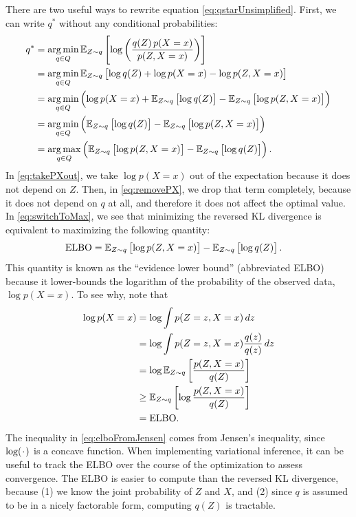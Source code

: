 \documentclass[11pt]{article}
\newcommand{\ELBO}{\mathrm{ELBO}}
\newcommand*{\placeholder}{\makebox[1ex]{$\cdot$}}
\begin{document}
There are two useful ways to rewrite equation \eqref{eq:qstarUnsimplified}.
First, we can write $q^*$ without any conditional probabilities:
\begin{align}
q^*
&= \operatorname*{arg\,min}_{q \in Q} \mathbb{E}_{\substack{Z \sim q}}\left[  \log \left( \frac{q(Z) \, p(X = x)}{p(Z, X = x)} \right)  \right] \\
&= \operatorname*{arg\,min}_{q \in Q} \mathbb{E}_{\substack{Z \sim q}}\left[  \log q(Z) + \log p(X = x) - \log p(Z, X = x)  \right] \\
\label{eq:takePXout}
&= \operatorname*{arg\,min}_{q \in Q} \left(
    \log p(X = x) + \mathbb{E}_{\substack{Z \sim q}}\left[  \log q(Z)  \right] - \mathbb{E}_{\substack{Z \sim q}}\left[  \log p(Z, X = x)  \right]
    \right) \\
\label{eq:removePX}
&= \operatorname*{arg\,min}_{q \in Q} \left(
    \mathbb{E}_{\substack{Z \sim q}}\left[  \log q(Z)  \right] - \mathbb{E}_{\substack{Z \sim q}}\left[  \log p(Z, X = x)  \right]
    \right) \\
\label{eq:switchToMax}
&= \operatorname*{arg\,max}_{q \in Q} \left(
    \mathbb{E}_{\substack{Z \sim q}}\left[  \log p(Z, X = x)  \right] - \mathbb{E}_{\substack{Z \sim q}}\left[  \log q(Z)  \right]
\right).
\end{align}
In \eqref{eq:takePXout}, we take $\log p(X = x)$ out of the expectation because it does not depend on $Z$.
Then, in \eqref{eq:removePX}, we drop that term completely, because it does not depend on $q$ at all, and therefore it does not affect the optimal value.
In \eqref{eq:switchToMax}, we see that minimizing the reversed KL divergence is equivalent to maximizing the following quantity:
\begin{align}
\label{eq:ELBO}
\ELBO
&= \expectOver{Z \sim q}{ \log p(Z, X = x) } - \expectOver{Z \sim q}{ \log q(Z) }.
\end{align}
This quantity is known as the ``evidence lower bound'' (abbreviated ELBO) because it lower-bounds the logarithm of the probability of the observed data, $\log p(X = x)$.
To see why, note that
\begin{align}
\log p(X = x)
&= \log \int p(Z = z, X = x) \, dz \\
&= \log \int p(Z = z, X = x) \frac{q(z)}{q(z)} \, dz \\
&= \log \expectOver{Z \sim q}{ \frac{p(Z, X=x)}{q(Z)} } \\
\label{eq:elboFromJensen}
&\geq \expectOver{Z \sim q}{ \log \frac{p(Z, X=x)}{q(Z)} } \\
&= \ELBO.
\end{align}
The inequality in \eqref{eq:elboFromJensen} comes from Jensen's inequality, since $\log(\placeholder)$ is a concave function.
When implementing variational inference, it can be useful to track the ELBO over the course of the optimization to assess convergence.
The ELBO is easier to compute than the reversed KL divergence, because (1) we know the joint probability of $Z$ and $X$, and (2) since $q$ is assumed to be in a nicely factorable form, computing $q(Z)$ is tractable.
\end{document}
